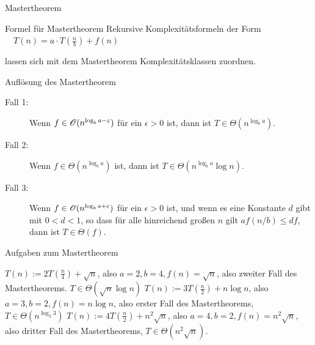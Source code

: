 \begin{frame}{Mastertheorem}
	\ip
	\begin{block}{Formel für Mastertheorem}
		\ip Rekursive Komplexitätsformeln der Form\\
		
		\vspace{.2cm}
		\ip$\quad T(n) = a \cdot T(\frac{n}{b}) + f(n)$
		\vspace{.2cm}
		
		\ip lassen sich mit dem Mastertheorem Komplexitätsklassen zuordnen.
	\end{block}

	\begin{block}{Auflösung des Mastertheorem}
		\begin{description}
			\item[Fall 1:] Wenn $f \in \mathscr{O}(n^{\log_b a -\varepsilon})$ für ein
			$\epsilon>0$ ist, dann ist $T\in \Theta(n^{\log_b a})$.
			\item[Fall 2:] Wenn $f \in \Theta(n^{\log_b a})$ ist, dann ist
			$T\in \Theta(n^{\log_b a}\log n)$.
			\item[Fall 3:] Wenn $f \in \mathscr{O}(n^{\log_b a +\varepsilon})$ für ein
			$\epsilon>0$ ist, und wenn es eine Konstante $d$ gibt mit $0<d<1$, so
			dass für alle hinreichend großen $n$ gilt $af(n/b)\leq d f$, dann
			ist $T\in \Theta(f)$.
		\end{description}
	\end{block}
\end{frame}

\begin{frame}{Aufgaben zum Mastertheorem}
	\begin{itemize}
		\pitem $T(n) := 2 T(\frac{n}{4}) + \sqrt{n}$\pause, also $a=2, b=4, f(n) = \sqrt{n}$\pause, also zweiter Fall des Mastertheorems\pause. $T \in \Theta (\sqrt{n}\log n)$
		\pitem $T(n) := 3 T(\frac{n}{2}) + n\log n$\pause, also $a = 3, b=2, f(n) = n\log n$\pause, also erster Fall des Mastertheorems\pause, $T \in \Theta(n^{\log_2 3})$
		\pitem $T(n) := 4 T(\frac{n}{2}) + n^2\sqrt{n}$\pause, also $a = 4, b=2, f(n) = n^2\sqrt{n}$\pause, also dritter Fall des Mastertheorems\pause, $T \in \Theta(n^2\sqrt{n})$.
	\end{itemize}
\end{frame}


